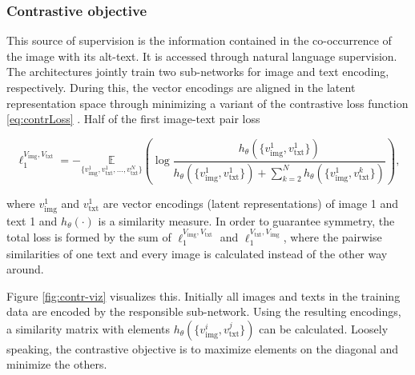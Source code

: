 \documentclass[
]{krantz}
\begin{document}
\hypertarget{contrObj}{%
\subsubsection{Contrastive objective}\label{contrObj}}

This source of supervision is the information contained in the co-occurrence of the image with its alt-text.
It is accessed through natural language supervision.
The architectures jointly train two sub-networks for image and text encoding, respectively.
During this, the vector encodings are aligned in the latent representation space through minimizing a variant of the contrastive loss function \eqref{eq:contrLoss} \citep{tian2020contrastive}.
Half of the first image-text pair loss

\begin{equation}
  \ell_1^{V_\text{img}, V_\text{txt}} = - \underset{\{v_\text{img}^1, v_\text{txt}^1, \ldots, v_\text{txt}^N\}}{\mathbb{E}} \left( \log \frac{h_\theta(\{v_\text{img}^1,v_\text{txt}^1\})}{h_\theta(\{v_\text{img}^1,v_\text{txt}^1\}) + \sum_{k=2}^N h_\theta(\{v_\text{img}^1, v_\text{txt}^k\})} \right),
  \label{eq:contrLoss}
\end{equation}

where \(v_\text{img}^1\) and \(v_\text{txt}^1\) are vector encodings (latent representations) of image 1 and text 1 and \(h_\theta(\cdot)\) is a similarity measure.
In order to guarantee symmetry, the total loss is formed by the sum of \(\ell_1^{V_\text{img}, V_\text{txt}}\) and \(\ell_1^{V_\text{txt}, V_\text{img}}\), where the pairwise similarities of one text and every image is calculated instead of the other way around.

Figure \ref{fig:contr-viz} visualizes this.
Initially all images and texts in the training data are encoded by the responsible sub-network.
Using the resulting encodings, a similarity matrix with elements \(h_\theta(\{v_\text{img}^i,v_\text{txt}^j\})\) can be calculated.
Loosely speaking, the contrastive objective is to maximize elements on the diagonal and minimize the others.
\end{document}

